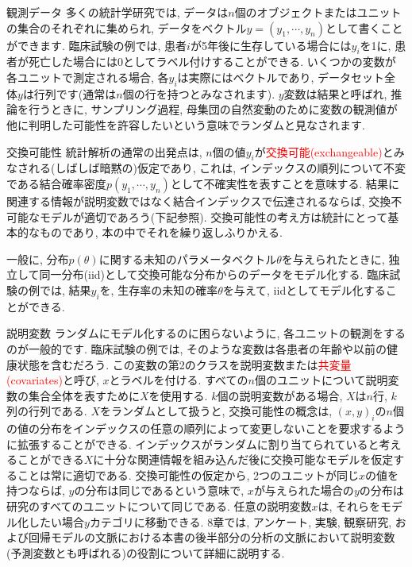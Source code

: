 \documentclass[10pt,dvipdfmx,a4]{beamer}
\newcommand{\tcr}[1]{\textcolor{red}{#1}}
\begin{document}

\begin{frame}{観測データ}
多くの統計学研究では, データは$n$個のオブジェクトまたはユニットの集合のそれぞれに集められ, データをベクトル$y=(y_1, \cdots ,y_n)$として書くことができます.
臨床試験の例では, 患者$i$が5年後に生存している場合には$y_i$を1に, 患者が死亡した場合には0としてラベル付けすることができる.
いくつかの変数が各ユニットで測定される場合, 各$y_i$は実際にはベクトルであり, データセット全体$y$は行列です(通常は$n$個の行を持つとみなされます).
$y$変数は結果と呼ばれ, 推論を行うときに, サンプリング過程, 母集団の自然変動のために変数の観測値が他に判明した可能性を許容したいという意味でランダムと見なされます.
\end{frame}


\begin{frame}{交換可能性}
統計解析の通常の出発点は, $n$個の値$y_i$が\tcr{交換可能(exchangeable)}とみなされる(しばしば暗黙の)仮定であり, これは, インデックスの順列について不変である結合確率密度$p(y_1,\cdots , y_n)$として不確実性を表すことを意味する.
結果に関連する情報が説明変数ではなく結合インデックスで伝達されるならば, 交換不可能なモデルが適切であろう(下記参照).
交換可能性の考え方は統計にとって基本的なものであり, 本の中でそれを繰り返しふりかえる.

一般に, 分布$p(\theta)$に関する未知のパラメータベクトル$\theta$を与えられたときに, 独立して同一分布(iid)として交換可能な分布からのデータをモデル化する.
臨床試験の例では, 結果$y_i$を, 生存率の未知の確率$\theta$を与えて, iidとしてモデル化することができる.
\end{frame}


\begin{frame}{説明変数}
ランダムにモデル化するのに困らないように, 各ユニットの観測をするのが一般的です.
臨床試験の例では, そのような変数は各患者の年齢や以前の健康状態を含むだろう.
この変数の第2のクラスを説明変数または\tcr{共変量(covariates)}と呼び, $x$とラベルを付ける.
すべての$n$個のユニットについて説明変数の集合全体を表すために$X$を使用する.
$k$個の説明変数がある場合, $X$は$n$行, $k$列の行列である.
$X$をランダムとして扱うと, 交換可能性の概念は, $(x,y)_i$の$n$個の値の分布をインデックスの任意の順列によって変更しないことを要求するように拡張することができる.
インデックスがランダムに割り当てられていると考えることができる$X$に十分な関連情報を組み込んだ後に交換可能なモデルを仮定することは常に適切である.
交換可能性の仮定から, 2つのユニットが同じ$x$の値を持つならば, $y$の分布は同じであるという意味で, $x$が与えられた場合の$y$の分布は研究のすべてのユニットについて同じである.
任意の説明変数$x$は, それらをモデル化したい場合$y$カテゴリに移動できる.
8章では, アンケート, 実験, 観察研究, および回帰モデルの文脈における本書の後半部分の分析の文脈において説明変数(予測変数とも呼ばれる)の役割について詳細に説明する.
\end{frame}
\end{document}
